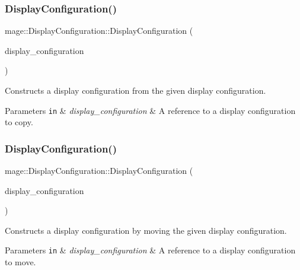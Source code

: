 \subsubsection{\texorpdfstring{Display\+Configuration()}{DisplayConfiguration()}\hspace{0.1cm}{\footnotesize\ttfamily [2/3]}}
{\footnotesize\ttfamily mage\+::\+Display\+Configuration\+::\+Display\+Configuration (\begin{DoxyParamCaption}\item[{const \hyperlink{structmage_1_1_display_configuration}{Display\+Configuration} \&}]{display\+\_\+configuration }\end{DoxyParamCaption})\hspace{0.3cm}{\ttfamily [default]}}

Constructs a display configuration from the given display configuration.


\begin{DoxyParams}[1]{Parameters}
\mbox{\tt in}  & {\em display\+\_\+configuration} & A reference to a display configuration to copy. \\
\hline
\end{DoxyParams}
\hypertarget{structmage_1_1_display_configuration_a5adbfbaf7de92292af56b2b56f76d548}{}\label{structmage_1_1_display_configuration_a5adbfbaf7de92292af56b2b56f76d548} 
\subsubsection{\texorpdfstring{Display\+Configuration()}{DisplayConfiguration()}\hspace{0.1cm}{\footnotesize\ttfamily [3/3]}}
{\footnotesize\ttfamily mage\+::\+Display\+Configuration\+::\+Display\+Configuration (\begin{DoxyParamCaption}\item[{\hyperlink{structmage_1_1_display_configuration}{Display\+Configuration} \&\&}]{display\+\_\+configuration }\end{DoxyParamCaption})\hspace{0.3cm}{\ttfamily [default]}}

Constructs a display configuration by moving the given display configuration.


\begin{DoxyParams}[1]{Parameters}
\mbox{\tt in}  & {\em display\+\_\+configuration} & A reference to a display configuration to move. \\
\hline
\end{DoxyParams}
\hypertarget{structmage_1_1_display_configuration_a91cdf4f2015177e41290238d96a55328}{}\label{structmage_1_1_display_configuration_a91cdf4f2015177e41290238d96a55328} 
